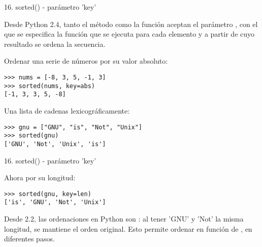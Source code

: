 
\begin{frame}[fragile]{16. sorted() - parámetro 'key'}
  \footnotesize
  \begin{block}{}
    \centering
    Desde Python 2.4, tanto el método  como la
    función  aceptan el parámetro ,
    con el que se especifica la función que se ejecuta para cada
    elemento y a partir de cuyo resultado se ordena la secuencia.
  \end{block}

  \begin{exampleblock}
    {Ordenar una serie de números por su valor absoluto:}
    \begin{lstlisting}
>>> nums = [-8, 3, 5, -1, 3]
>>> sorted(nums, key=abs)
[-1, 3, 3, 5, -8]
    \end{lstlisting}
  \end{exampleblock}

  \begin{exampleblock}
    {Una lista de cadenas lexicográficamente:}
    \begin{lstlisting}
>>> gnu = ["GNU", "is", "Not", "Unix"]
>>> sorted(gnu)
['GNU', 'Not', 'Unix', 'is']
    \end{lstlisting}
  \end{exampleblock}
\end{frame}

\begin{frame}[fragile]{16. sorted() - parámetro 'key'}
  \begin{exampleblock}
    {Ahora por su longitud:}
    \begin{lstlisting}
>>> sorted(gnu, key=len)
['is', 'GNU', 'Not', 'Unix']
    \end{lstlisting}
  \end{exampleblock}

  \begin{alertblock}{}
    \centering
    Desde 2.2, las ordenaciones en Python son : al
    tener 'GNU' y 'Not' la misma longitud, se mantiene el orden
    original. Esto permite ordenar en función de , en diferentes pasos.
  \end{alertblock}
\end{frame}

